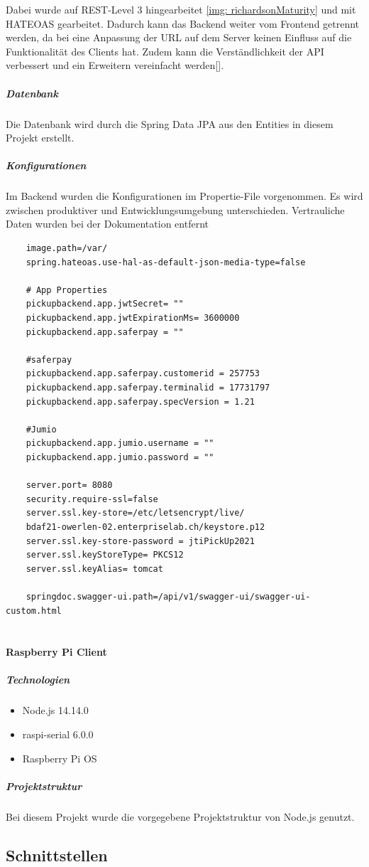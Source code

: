 Dabei wurde auf REST-Level 3 hingearbeitet \ref{img: richardsonMaturity} und mit \ac{HATEOAS} gearbeitet. Dadurch kann das Backend weiter vom Frontend getrennt werden, da bei eine Anpassung der URL auf dem Server keinen Einfluss auf die Funktionalität des Clients hat. Zudem kann die Verständlichkeit der API verbessert und ein Erweitern vereinfacht werden[\cite{richardsonMaturity}]. 
\subparagraph{Datenbank}
Die Datenbank wird durch die Spring Data JPA aus den Entities in diesem Projekt erstellt. 
\newpage
\subparagraph{Konfigurationen}
Im Backend wurden die Konfigurationen im \gls{Propertie-File} vorgenommen. Es wird zwischen produktiver und Entwicklungsumgebung unterschieden. Vertrauliche Daten wurden bei der Dokumentation entfernt
\begin{verbatim}
	image.path=/var/
	spring.hateoas.use-hal-as-default-json-media-type=false
	
	# App Properties
	pickupbackend.app.jwtSecret= ""
	pickupbackend.app.jwtExpirationMs= 3600000
	pickupbackend.app.saferpay = ""
	
	#saferpay
	pickupbackend.app.saferpay.customerid = 257753
	pickupbackend.app.saferpay.terminalid = 17731797
	pickupbackend.app.saferpay.specVersion = 1.21
	
	#Jumio
	pickupbackend.app.jumio.username = ""
	pickupbackend.app.jumio.password = ""
	
	server.port= 8080
	security.require-ssl=false
	server.ssl.key-store=/etc/letsencrypt/live/
	bdaf21-owerlen-02.enterpriselab.ch/keystore.p12
	server.ssl.key-store-password = jtiPickUp2021
	server.ssl.keyStoreType= PKCS12
	server.ssl.keyAlias= tomcat
	
	springdoc.swagger-ui.path=/api/v1/swagger-ui/swagger-ui-custom.html
	
\end{verbatim}
\paragraph{Raspberry Pi Client}
\subparagraph{Technologien}
\begin{itemize}
	\item Node.js 14.14.0
	\item raspi-serial 6.0.0
	\item Raspberry Pi OS 
\end{itemize}
\subparagraph{Projektstruktur}
Bei diesem Projekt wurde die vorgegebene Projektstruktur von Node.js genutzt.
\newpage
\subsection{Schnittstellen}
